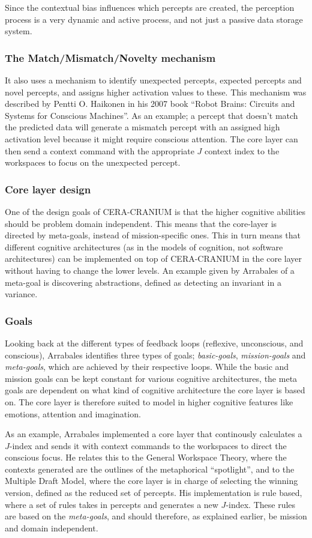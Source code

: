 Since the contextual bias influences which percepts are created, the perception
process is a very dynamic and active process, and not just a passive data
storage system.

\subsubsection{The Match/Mismatch/Novelty mechanism}
It also uses a mechanism to identify unexpected percepts, expected percepts and
novel percepts, and assigns higher activation values to these. This mechanism
was described by Pentti O. Haikonen in his 2007 book ``Robot Brains: Circuits
and Systems for Conscious Machines''\cite{haikonen2007robotbrains}. As an
example; a percept that doesn't match the predicted data will generate a
mismatch percept with an assigned high activation level because it might
require conscious attention. The core layer can then send a context command
with the appropriate $J$ context index to the workspaces to focus on the
unexpected percept.

\subsubsection{Core layer design}
One of the design goals of CERA-CRANIUM is that the higher cognitive abilities
should be problem domain independent.\cite{Arrabales2009} This means that the
core-layer is directed by meta-goals, instead of mission-specific ones. This
in turn means that different cognitive architectures (as in the models of
cognition, not software architectures) can be implemented on top of
CERA-CRANIUM in the core layer without having to change the lower levels. An
example given by Arrabales of a meta-goal is discovering abstractions, defined
as detecting an invariant in a variance.

\subsubsection{Goals}
Looking back at the different types of feedback loops (reflexive, unconscious,
and conscious), Arrabales identifies three types of goals;
\textit{basic-goals}, \textit{mission-goals} and \textit{meta-goals}, which are
achieved by their respective loops. While the basic and mission goals can be
kept constant for various cognitive architectures, the meta goals are dependent
on what kind of cognitive architecture the core layer is based on. The core
layer is therefore suited to model in higher cognitive features like emotions,
attention and imagination.

As an example, Arrabales implemented a core layer that continously calculates
a $J$-index and sends it with context commands to the workspaces to direct the
conscious focus. He relates this to the General Workspace Theory, where the
contexts generated are the outlines of the metaphorical ``spotlight'', and to
the Multiple Draft Model, where the core layer is in charge of selecting the
winning version, defined as the reduced set of percepts. His implementation is
rule based, where a set of rules takes in percepts and generates a new
$J$-index. These rules are based on the \textit{meta-goals}, and should
therefore, as explained earlier, be mission and domain independent.